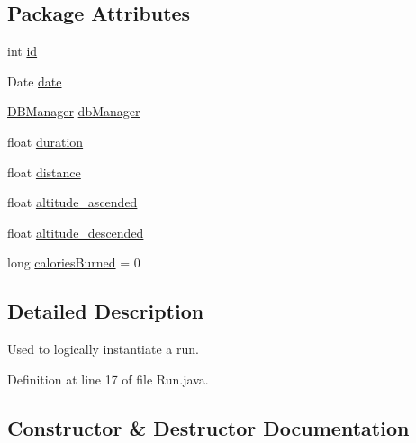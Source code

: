 \subsection*{Package Attributes}
\begin{DoxyCompactItemize}
\item 
int \mbox{\hyperlink{classcom_1_1activitytracker_1_1_run_aa76717aee690b5bfe919d6e87dea1d84}{id}}
\item 
Date \mbox{\hyperlink{classcom_1_1activitytracker_1_1_run_a66934b1f4fe6bc74a4e98574a2892764}{date}}
\item 
\mbox{\hyperlink{classcom_1_1activitytracker_1_1_d_b_manager}{D\+B\+Manager}} \mbox{\hyperlink{classcom_1_1activitytracker_1_1_run_ab90e32eda9f4c671ae3575f971edca6b}{db\+Manager}}
\item 
float \mbox{\hyperlink{classcom_1_1activitytracker_1_1_run_a5e38d293d29d4b65c9290ff4bee82e03}{duration}}
\item 
float \mbox{\hyperlink{classcom_1_1activitytracker_1_1_run_a7b4ca8c4ecea4da1653f03b8c8fc16a8}{distance}}
\item 
float \mbox{\hyperlink{classcom_1_1activitytracker_1_1_run_a247fe29ef5dceeb25750fc7c2701f5c8}{altitude\+\_\+ascended}}
\item 
float \mbox{\hyperlink{classcom_1_1activitytracker_1_1_run_a26cd078680ee374482ce848b90308dda}{altitude\+\_\+descended}}
\item 
long \mbox{\hyperlink{classcom_1_1activitytracker_1_1_run_aa4c73467653a47d3b14ff6653bbab853}{calories\+Burned}} = 0
\end{DoxyCompactItemize}


\subsection{Detailed Description}
Used to logically instantiate a run. 

Definition at line 17 of file Run.\+java.



\subsection{Constructor \& Destructor Documentation}
\mbox{\label{classcom_1_1activitytracker_1_1_run_a5568c1c514835056d2abc22cfba222c5}} 
